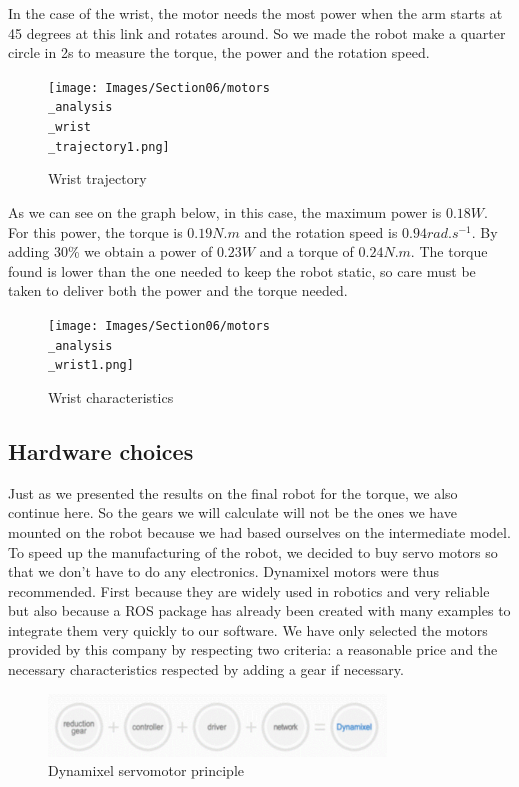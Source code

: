 In the case of the wrist, the motor needs the most power when the arm starts at 45 degrees at this link and rotates around. So we made the robot make a quarter circle in 2s to measure the torque, the power and the rotation speed.

\begin{figure}[ht]
    \centering
    \texttt{[image: Images/Section06/motors\\\_analysis\\\_wrist\\\_trajectory1.png]}
    \caption{Wrist trajectory}
    \label{fig:WristTrajectory}
\end{figure}
\FloatBarrier

As we can see on the graph below, in this case, the maximum power is $0.18W$. For this power, the torque is $0.19N.m$ and the rotation speed is $0.94rad.s^{-1}$. By adding 30\% we obtain a power of $0.23W$ and a torque of $0.24N.m$. The torque found is lower than the one needed to keep the robot static, so care must be taken to deliver both the power and the torque needed.
\begin{figure}[ht]
    \centering
    \texttt{[image: Images/Section06/motors\\\_analysis\\\_wrist1.png]}
    \caption{Wrist characteristics}
    \label{fig:WristCharacteristics}
\end{figure}
\FloatBarrier

\subsection{Hardware choices}

Just as we presented the results on the final robot for the torque, we also continue here. So the gears we will calculate will not be the ones we have mounted on the robot because we had based ourselves on the intermediate model. To speed up the manufacturing of the robot, we decided to buy servo motors so that we don't have to do any electronics. Dynamixel \cite{Dynamixel} motors were thus recommended. First because they are widely used in robotics and very reliable but also because a ROS package has already been created with many examples to integrate them very quickly to our software. We have only selected the motors provided by this company by respecting two criteria: a reasonable price and the necessary characteristics respected by adding a gear if necessary.

\begin{figure}[ht]
    \centering
    \includegraphics[width=0.8\textwidth]{Images/Section06/dynamixel.png}
    \caption{Dynamixel servomotor principle}
    \label{fig:DynamixelPrinciple}
\end{figure}
\FloatBarrier

